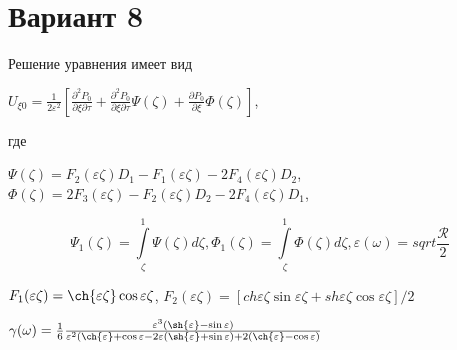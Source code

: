 \documentclass{article}
\begin{document}
\section*{Вариант 8}

Решение уравнения имеет вид 
\begin{center}
$U_{\xi0} = \frac{1}{2\varepsilon^2} [\frac{\partial^2P_0}{\partial\xi\partial\tau}+\frac{\partial^2P_0}{\partial\xi\partial\tau}\Psi(\zeta)+\frac{\partial P_0}{\partial\xi}\Phi(\zeta)]$, 
\end{center}
где
\begin{center}
$\Psi(\zeta) = F_2(\varepsilon\zeta)D_1-F_1(\varepsilon\zeta)-2F_4(\varepsilon\zeta)D_2$, $\Phi(\zeta) = 2F_3(\varepsilon\zeta)-F_2(\varepsilon\zeta)D_2-2F_4(\varepsilon\zeta)D_1$,

\begin{equation}
\Psi_1(\zeta) = \int\limits_{\zeta}^{1} \Psi(\zeta)d\zeta,
\Phi_1(\zeta) = \int\limits_{\zeta}^{1} \Phi(\zeta)d\zeta, \varepsilon(\omega) = sqrt{\frac{\mathcal{R}}{2}}
\end{equation} 


$F_1(\varepsilon\zeta) = \ch{\varepsilon\zeta}\cos{\varepsilon\zeta}$, $F_2(\varepsilon\zeta)=[ch{\varepsilon\zeta}\sin{\varepsilon\zeta}+sh{\varepsilon\zeta}\cos{\varepsilon\zeta}]/2$

$\gamma(\omega) = \frac{1}{6} \frac{\varepsilon^3(\sh{\varepsilon}-\sin{\varepsilon})}{\varepsilon^2(\ch{\varepsilon}+\cos{\varepsilon} - 2\varepsilon(\sh{\varepsilon}+\sin{\varepsilon}) + 2(\ch{\varepsilon}-\cos{\varepsilon})}$
\end{center}
\end{document}
